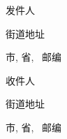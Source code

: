 \documentclass{letter}
\begin{document}
发件人

街道地址

市, 省, \ 邮编

\vspace{1.0in}\large
\setlength\parindent{3.6in}

收件人

街道地址

市, 省, \ 邮编
\end{document}

